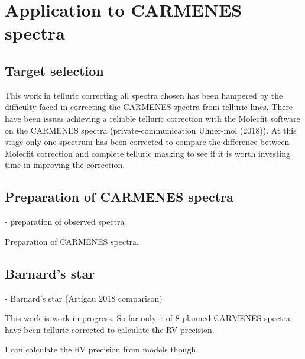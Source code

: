 
\section{Application to {CARMENES} spectra}


\subsection{Target selection}
This work in telluric correcting all spectra chosen has been hampered by the difficulty faced in correcting the CARMENES spectra from telluric lines. There have been issues achieving a reliable telluric correction with the Molecfit software on the {CARMENES} spectra (private-communication Ulmer-mol (2018)).
At this stage only one spectrum has been corrected to compare the difference between Molecfit correction and complete telluric masking to see if it is worth investing time in improving the correction.


\citep{passegger_carmenes_2018, rajpurohit_exploring_2018}

\subsection{Preparation of CARMENES spectra}
- preparation of observed spectra

Preparation of {CARMENES} spectra.



\subsection{Barnard's star}
- Barnard's star (Artigau 2018 comparison)


This work is work in progress.
So far only 1 of 8 planned {CARMENES} spectra have been telluric corrected to calculate the {RV} precision.

{I can calculate the {RV} precision from models though.}